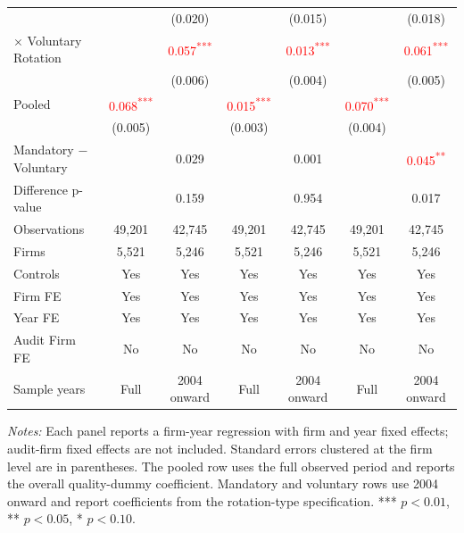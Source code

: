 \documentclass[10pt]{article}
\newcommand{\sym}[1]{\textsuperscript{#1}}
\begin{document}
\begin{minipage}{19cm}
\begin{threeparttable}
\begin{tabular}{l cc cc cc}
 &  & (0.020) &  & (0.015) &  & (0.018) \\
$\times$ Voluntary Rotation &  & \textcolor{red}{0.057\sym{***}} &  & \textcolor{red}{0.013\sym{***}} &  & \textcolor{red}{0.061\sym{***}} \\
 &  & (0.006) &  & (0.004) &  & (0.005) \\
Pooled & \textcolor{red}{0.068\sym{***}} &  & \textcolor{red}{0.015\sym{***}} &  & \textcolor{red}{0.070\sym{***}} &  \\
 & (0.005) &  & (0.003) &  & (0.004) &  \\
Mandatory $-$ Voluntary &  & 0.029 &  & 0.001 &  & \textcolor{red}{0.045\sym{**}} \\
Difference p-value &  & 0.159 &  & 0.954 &  & 0.017 \\
Observations & 49,201 & 42,745 & 49,201 & 42,745 & 49,201 & 42,745 \\
Firms & 5,521 & 5,246 & 5,521 & 5,246 & 5,521 & 5,246 \\
\midrule
Controls & Yes & Yes & Yes & Yes & Yes & Yes \\
Firm FE & Yes & Yes & Yes & Yes & Yes & Yes \\
Year FE & Yes & Yes & Yes & Yes & Yes & Yes \\
Audit Firm FE & No & No & No & No & No & No \\
Sample years & Full & 2004 onward & Full & 2004 onward & Full & 2004 onward \\
\bottomrule
\end{tabular}
\begin{tablenotes}\fontsize{9}{11}\selectfont
\item \fontsize{9}{11}\selectfont \textit{Notes:} Each panel reports a firm-year regression with firm and year fixed effects; audit-firm fixed effects are not included. Standard errors clustered at the firm level are in parentheses. The pooled row uses the full observed period and reports the overall quality-dummy coefficient. Mandatory and voluntary rows use 2004 onward and report coefficients from the rotation-type specification. *** \(p<0.01\), ** \(p<0.05\), * \(p<0.10\).
\end{tablenotes}
\end{threeparttable}

\end{minipage}
\end{document}
